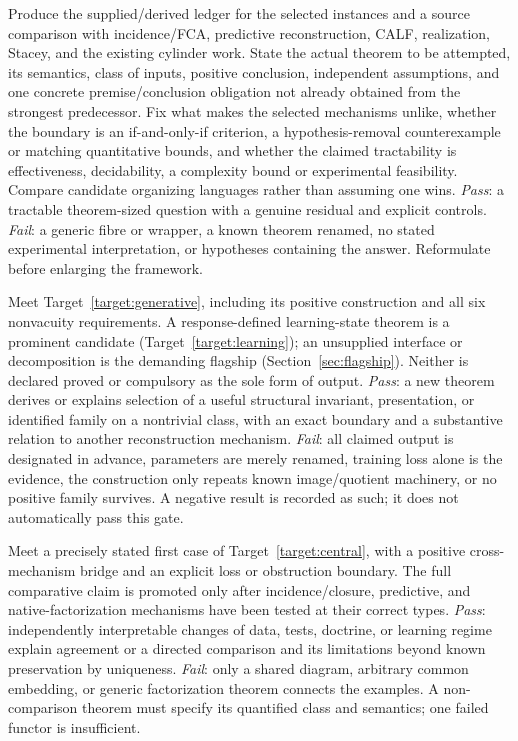 \documentclass[11pt]{article}
\theoremstyle{remark}
\begin{document}
\begin{description}[style=nextline,leftmargin=0pt]
\item[Gate A \quad State the first research problem]
Produce the supplied/derived ledger for the selected instances and a source comparison with incidence/FCA, predictive reconstruction, CALF, realization, Stacey, and the existing cylinder work. State the actual theorem to be attempted, its semantics, class of inputs, positive conclusion, independent assumptions, and one concrete premise/conclusion obligation not already obtained from the strongest predecessor. Fix what makes the selected mechanisms unlike, whether the boundary is an if-and-only-if criterion, a hypothesis-removal counterexample or matching quantitative bounds, and whether the claimed tractability is effectiveness, decidability, a complexity bound or experimental feasibility. Compare candidate organizing languages rather than assuming one wins. \emph{Pass}: a tractable theorem-sized question with a genuine residual and explicit controls. \emph{Fail}: a generic fibre or wrapper, a known theorem renamed, no stated experimental interpretation, or hypotheses containing the answer. Reformulate before enlarging the framework.

\item[Gate B \quad Establish a generative result]
Meet Target~\ref{target:generative}, including its positive construction and all six nonvacuity requirements. A response-defined learning-state theorem is a prominent candidate (Target~\ref{target:learning}); an unsupplied interface or decomposition is the demanding flagship (Section~\ref{sec:flagship}). Neither is declared proved or compulsory as the sole form of output. \emph{Pass}: a new theorem derives or explains selection of a useful structural invariant, presentation, or identified family on a nontrivial class, with an exact boundary and a substantive relation to another reconstruction mechanism. \emph{Fail}: all claimed output is designated in advance, parameters are merely renamed, training loss alone is the evidence, the construction only repeats known image/quotient machinery, or no positive family survives. A negative result is recorded as such; it does not automatically pass this gate.

\item[Gate C \quad Establish a comparative result]
Meet a precisely stated first case of Target~\ref{target:central}, with a positive cross-mechanism bridge and an explicit loss or obstruction boundary. The full comparative claim is promoted only after incidence/closure, predictive, and native-factorization mechanisms have been tested at their correct types. \emph{Pass}: independently interpretable changes of data, tests, doctrine, or learning regime explain agreement or a directed comparison and its limitations beyond known preservation by uniqueness. \emph{Fail}: only a shared diagram, arbitrary common embedding, or generic factorization theorem connects the examples. A non-comparison theorem must specify its quantified class and semantics; one failed functor is insufficient.


\end{description}
\end{document}
